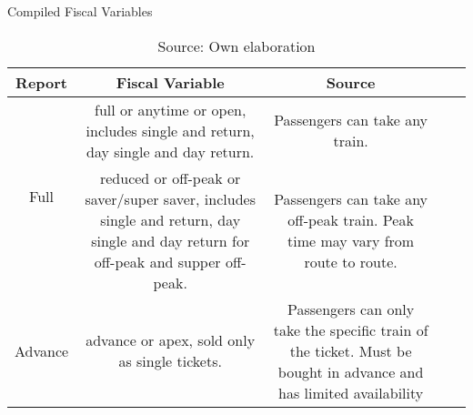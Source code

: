 \begin{table}[!ht] \centering 
  \caption{Compiled Fiscal Variables} 
  \label{tbl:fares-general} 
{\renewcommand\arraystretch{1.25}}
\begin{tabular} {ccccccc}
\toprule

Report                                 & 
\multicolumn{2}{c}{Fiscal Variable}    & 
\multicolumn{2}{c}{Source}             \\ 

\hline

\multirow{2}{*}{Full}                                          & 
\multicolumn{2}{p{6cm}}{\raggedright full or anytime or open, includes single and return, day single and day return.}                                                 & 
\multicolumn{2}{p{6cm}}{\raggedright Passengers can take any train.}    \\

\hline

\multirow{2}{*}{Reduced}                                                                                     &  
\multicolumn{2}{p{6cm}}{\raggedright reduced or off-peak or saver/super saver, includes single and return, day single and day return for off-peak and supper off-peak.}                                       & 
\multicolumn{2}{p{6cm}}{\raggedright Passengers can take any off-peak train. Peak time may vary from route to route.} \\

\hline

\multirow{2}{*}{Advance}                                                                     & 
\multicolumn{2}{p{6cm}}{\raggedright advance or apex, sold only as single tickets.} & 
\multicolumn{2}{p{6cm}}{\raggedright Passengers can only take the specific train of the ticket. Must be bought in advance and has limited availability}                                                                 \\

\bottomrule
\end{tabular}%
\caption*{Source: Own elaboration}
\end{table} 

